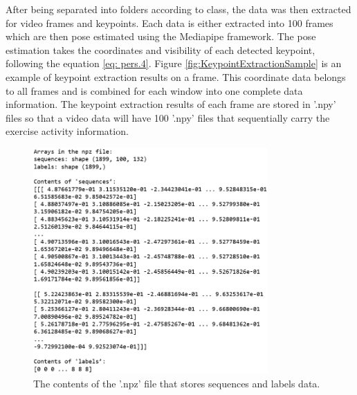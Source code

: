 After being separated into folders according to class, the data was then extracted for video frames and keypoints. Each data is either extracted into 100 frames which are then pose estimated using the Mediapipe framework. The pose estimation takes the coordinates and visibility of each detected keypoint, following the equation \ref{eq: pers.4}. Figure \ref{fig:KeypointExtractionSample} is an example of keypoint extraction results on a frame. This coordinate data belongs to all frames and is combined for each window into one complete data information. The keypoint extraction results of each frame are stored in '.npy' files so that a video data will have 100 '.npy' files that sequentially carry the exercise activity information.

\begin{figure}[h!]
	\centering
	\includegraphics[width=0.8\textwidth]{bab4/ar_npzFile.png}
	\caption{The contents of the '.npz' file that stores sequences and labels data.}
	\label{fig:npzFile}
\end{figure}

